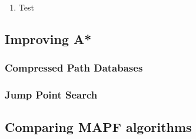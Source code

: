 \documentclass[a4paper,11pt]{article}
\begin{document}
\begin{enumerate}
	\item Test
\end{enumerate}



\subsubsection{}

\subsection{Improving A*}

\subsubsection{Compressed Path Databases}

\subsubsection{Jump Point Search}

\cite{renukamurthy2016improving}







\subsection{Comparing MAPF algorithms}
\end{document}
